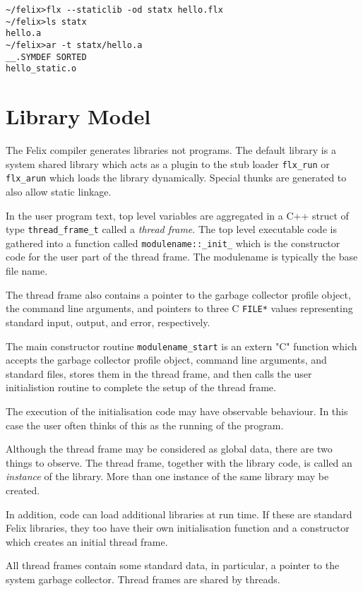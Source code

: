 \documentclass[oneside]{book}
\begin{document}
\begin{verbatim}
~/felix>flx --staticlib -od statx hello.flx
~/felix>ls statx
hello.a
~/felix>ar -t statx/hello.a
__.SYMDEF SORTED
hello_static.o
\end{verbatim}


\chapter{Library Model}
The Felix compiler generates libraries not programs.
The default library is a system shared library which acts as a plugin
to the stub loader \verb$flx_run$ or \verb$flx_arun$
which loads the library dynamically. Special thunks
are generated to also allow static linkage.

In the user program text, top level variables are aggregated in a C++ struct
of type \verb$thread_frame_t$ called a {\em thread frame}. The top level executable
code is gathered into a function called \verb$modulename::_init_$ which is the 
constructor code for the user part of the thread frame. The modulename is typically the base
file name.

The thread frame also contains a pointer to the garbage collector profile
object, the command line arguments, and pointers to three C \verb$FILE*$ 
values representing standard input,
output, and error, respectively.

The main constructor routine \verb$modulename_start$ is an extern "C" 
function which accepts the garbage collector profile object, command line arguments,
and standard files, stores them in the thread frame, and then calls the user initialistion
routine to complete the setup of the thread frame.

The execution of the initialisation code may have observable behaviour.
In this case the user often thinks of this as the running of the program.

Although the thread frame may be considered as global data, there are two
things to observe. The thread frame, together with the library code,
is called an {\em instance} of the library. More than one instance
of the same library may be created.

In addition, code can load additional libraries at run time. If these are
standard Felix libraries, they too have their own initialisation function
and a constructor which creates an initial thread frame.

All thread frames contain some standard data, in particular, a pointer
to the system garbage collector. Thread frames are shared by threads.
\end{document}
